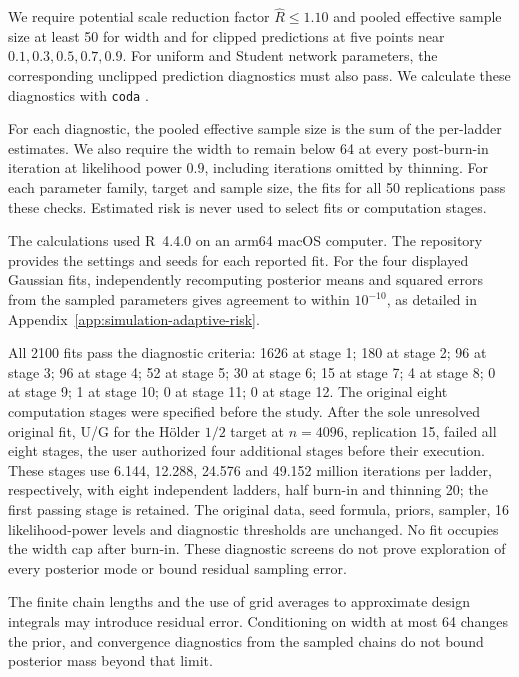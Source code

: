 \documentclass[11pt,a4paper]{article}
\theoremstyle{remark}
\begin{document}
{We require potential scale reduction factor
$\widehat R\leq1.10$ \citep{gelman1992inference} and pooled effective sample size at least 50
for width and for clipped predictions at five points near
$0.1,0.3,0.5,0.7,0.9$.
For uniform and Student network parameters, the corresponding unclipped
prediction diagnostics must also pass.
We calculate these diagnostics with \texttt{coda}
\citep{plummer2006coda}.

For each diagnostic, the pooled effective sample size is the sum of
the per-ladder estimates. We also require the width to remain below
64 at every post-burn-in iteration at likelihood power $0.9$,
including iterations omitted by thinning. For each parameter family,
target and sample size, the fits for all 50 replications pass these
checks. Estimated risk is never used to select fits or computation stages.

The calculations used R~4.4.0 on an arm64 macOS computer. The repository
provides the settings and seeds for each reported fit. For the four
displayed Gaussian fits, independently recomputing posterior means and
squared errors from the sampled parameters gives agreement to within
$10^{-10}$, as detailed in Appendix~\ref{app:simulation-adaptive-risk}.}

{All 2100 fits pass the diagnostic criteria: 1626 at stage 1; 180 at stage 2; 96 at stage 3; 96 at stage 4; 52 at stage 5; 30 at stage 6; 15 at stage 7; 4 at stage 8; 0 at stage 9; 1 at stage 10; 0 at stage 11; 0 at stage 12. The original eight computation stages were specified before the study. After the sole unresolved original fit, U/G for the H\"older $1/2$ target at $n=4096$, replication 15, failed all eight stages, the user authorized four additional stages before their execution. These stages use 6.144, 12.288, 24.576 and 49.152 million iterations per ladder, respectively, with eight independent ladders, half burn-in and thinning 20; the first passing stage is retained. The original data, seed formula, priors, sampler, 16 likelihood-power levels and diagnostic thresholds are unchanged. No fit occupies the width cap after burn-in. These diagnostic screens do not prove exploration of every posterior mode or bound residual sampling error.}

{The finite chain lengths and the use of grid averages to approximate
design integrals may introduce residual error.
Conditioning on width at most 64 changes the prior, and convergence
diagnostics from the sampled chains do not bound posterior mass
beyond that limit.}
\end{document}
